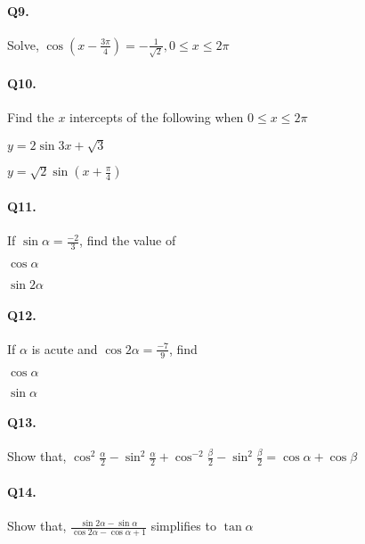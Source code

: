 \documentclass{article}
\begin{document}
\paragraph{Q9.}
Solve, $\cos \left( x - \frac{3\pi}{4} \right)= -\frac{1}{\sqrt{2}}, 0 \leq x \leq 2\pi$

\paragraph{Q10.}
Find the $x$ intercepts of the following when $0 \leq x \leq 2\pi$ 

\begin{enumerate*}[label=(\alph*)]
  \item $y = 2\sin 3x + \sqrt{3}$
  \item $y = \sqrt{2}\sin \left( x + \frac{\pi}{4} \right)$
\end{enumerate*}

\paragraph{Q11.}
If $\sin \alpha = \frac{-2}{3}$, find the value of

\begin{enumerate*}[label=(\alph*)]
  \item $\cos \alpha$
  \item $\sin 2\alpha$
\end{enumerate*}

\paragraph{Q12.}
If $\alpha$ is acute and $\cos 2\alpha = \frac{-7}{9}$, find

\begin{enumerate*}[label=(\alph*)]
  \item $\cos \alpha$
  \item $\sin \alpha$
\end{enumerate*}

\paragraph{Q13.}
Show that, $\cos^{2}\frac{\alpha}{2} - \sin^{2}\frac{\alpha}{2} + \cos^{-2}\frac{\beta}{2} - \sin^{2}\frac{\beta}{2} = \cos \alpha + \cos \beta$

\paragraph{Q14.}
Show that, $\frac{\sin 2\alpha - \sin\alpha}{\cos 2\alpha - \cos \alpha + 1}$ simplifies to $\tan \alpha$
\end{document}
